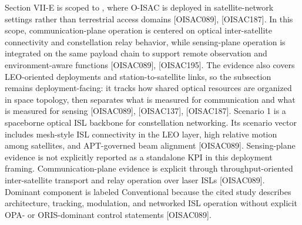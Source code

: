 \markdownRendererUlEndTight \markdownRendererInterblockSeparator
{}
\markdownRendererSectionEnd 
\markdownRendererSectionEnd \markdownRendererSectionBegin
{}\markdownRendererInterblockSeparator
{}\markdownRendererSectionBegin
{}\markdownRendererInterblockSeparator
{}Section VII-E is scoped to , where O-ISAC is deployed in satellite-network settings rather than terrestrial access domains [O\markdownRendererUnderscore{}ISAC\markdownRendererUnderscore{}089], [O\markdownRendererUnderscore{}ISAC\markdownRendererUnderscore{}187]. In this scope, communication-plane operation is centered on optical inter-satellite connectivity and constellation relay behavior, while sensing-plane operation is integrated on the same payload chain to support remote observation and environment-aware functions [O\markdownRendererUnderscore{}ISAC\markdownRendererUnderscore{}089], [O\markdownRendererUnderscore{}ISAC\markdownRendererUnderscore{}195]. The evidence also covers LEO-oriented deployments and station-to-satellite links, so the subsection remains deployment-facing: it tracks how shared optical resources are organized in space topology, then separates what is measured for communication and what is measured for sensing [O\markdownRendererUnderscore{}ISAC\markdownRendererUnderscore{}089], [O\markdownRendererUnderscore{}ISAC\markdownRendererUnderscore{}137], [O\markdownRendererUnderscore{}ISAC\markdownRendererUnderscore{}187].\markdownRendererInterblockSeparator
{}
\markdownRendererSectionEnd \markdownRendererSectionBegin
{}\markdownRendererInterblockSeparator
{}Scenario 1 is a spaceborne optical ISL backbone for constellation networking. Its scenario vector includes mesh-style ISL connectivity in the LEO layer, high relative motion among satellites, and APT-governed beam alignment [O\markdownRendererUnderscore{}ISAC\markdownRendererUnderscore{}089]. Sensing-plane evidence is not explicitly reported as a standalone KPI in this deployment framing. Communication-plane evidence is explicit through throughput-oriented inter-satellite transport and relay operation over laser ISLs [O\markdownRendererUnderscore{}ISAC\markdownRendererUnderscore{}089]. Dominant component is labeled Conventional because the cited study describes architecture, tracking, modulation, and networked ISL operation without explicit OPA- or ORIS-dominant control statements [O\markdownRendererUnderscore{}ISAC\markdownRendererUnderscore{}089].\markdownRendererParagraphSeparator
